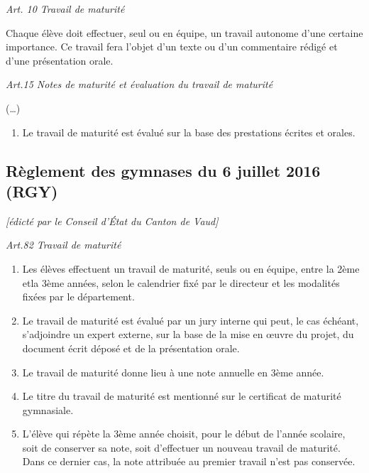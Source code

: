 \documentclass[
  10pt,
  french,
  a5paper,
  openany]{book}
\providecommand{\tightlist}{%
  \setlength{\itemsep}{0pt}\setlength{\parskip}{0pt}}
\begin{document}
\emph{Art. 10 Travail de maturité}

Chaque élève doit effectuer, seul ou en équipe, un travail autonome d'une certaine importance. Ce travail fera l'objet d'un texte ou d'un commentaire rédigé et d'une présentation orale.


\emph{Art.15 Notes de maturité et évaluation du travail de maturité}

(\ldots)

\begin{enumerate}
\def\labelenumi{\arabic{enumi}.}
\setcounter{enumi}{1}
\tightlist
\item
  Le travail de maturité est évalué sur la base des prestations écrites et orales.
\end{enumerate}


\clearpage

\hypertarget{ruxe8glement-des-gymnases-du-6-juillet-2016-rgy}{%
\subsection*{Règlement des gymnases du 6 juillet 2016 (RGY)}\label{ruxe8glement-des-gymnases-du-6-juillet-2016-rgy}}

\emph{{[}édicté par le Conseil d'État du Canton de Vaud{]}}

\emph{Art.82 Travail de maturité}

\begin{enumerate}
\def\labelenumi{\arabic{enumi}.}
\tightlist
\item
  Les élèves effectuent un travail de maturité, seuls ou en équipe, entre la 2ème etla 3ème années, selon le calendrier fixé par le directeur et les modalités fixées par le département.
\item
  Le travail de maturité est évalué par un jury interne qui peut, le cas échéant, s'adjoindre un expert externe, sur la base de la mise en œuvre du projet, du document écrit déposé et de la présentation orale.
\item
  Le travail de maturité donne lieu à une note annuelle en 3ème année.
\item
  Le titre du travail de maturité est mentionné sur le certificat de maturité gymnasiale.
\item
  L'élève qui répète la 3ème année choisit, pour le début de l'année scolaire, soit de conserver sa note, soit d'effectuer un nouveau travail de maturité. Dans ce dernier cas, la note attribuée au premier travail n'est pas conservée.
\end{enumerate}
\end{document}
